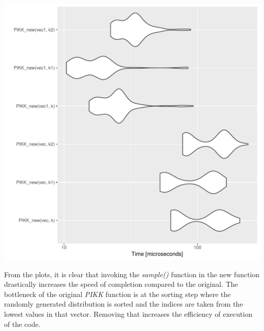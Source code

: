 \documentclass{article}\usepackage[]{graphicx}\usepackage[]{color}
\makeatletter
\def\maxwidth{ %
  \ifdim\Gin@nat@width>\linewidth
    \linewidth
  \else
    \Gin@nat@width
  \fi
}
\newenvironment{knitrout}{}{} %
\makeatother
\begin{document}
\begin{knitrout}
\includegraphics[width=\maxwidth]{figure/unnamed-chunk-12-2} 

\end{knitrout}
From the plots, it is clear that invoking the \emph{sample()} function in the new function drastically increases the speed of completion compared to the original.  The bottleneck of the original \emph{PIKK} function is at the sorting step where the randomly generated distribution is sorted and the indices are taken from the lowest values in that vector.  Removing that increases the efficiency of execution of the code.
\end{document}
